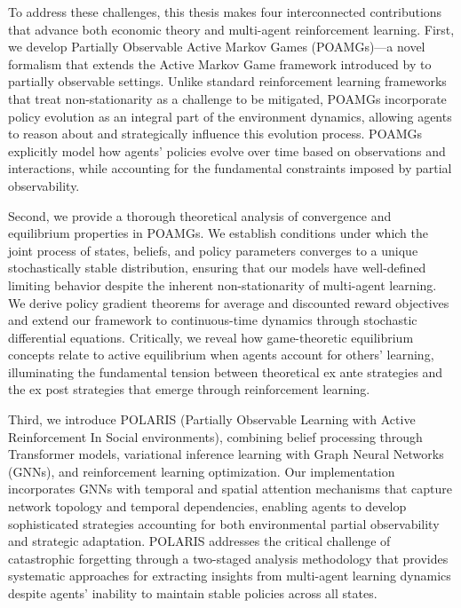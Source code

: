 To address these challenges, this thesis makes four interconnected contributions that advance both economic theory and multi-agent reinforcement learning. First, we develop Partially Observable Active Markov Games (POAMGs)—a novel formalism that extends the Active Markov Game framework introduced by \citet{kim2022influencing} to partially observable settings. Unlike standard reinforcement learning frameworks that treat non-stationarity as a challenge to be mitigated, POAMGs incorporate policy evolution as an integral part of the environment dynamics, allowing agents to reason about and strategically influence this evolution process. POAMGs explicitly model how agents' policies evolve over time based on observations and interactions, while accounting for the fundamental constraints imposed by partial observability.

Second, we provide a thorough theoretical analysis of convergence and equilibrium properties in POAMGs. We establish conditions under which the joint process of states, beliefs, and policy parameters converges to a unique stochastically stable distribution, ensuring that our models have well-defined limiting behavior despite the inherent non-stationarity of multi-agent learning. We derive policy gradient theorems for average and discounted reward objectives and extend our framework to continuous-time dynamics through stochastic differential equations. Critically, we reveal how game-theoretic equilibrium concepts relate to active equilibrium when agents account for others' learning, illuminating the fundamental tension between theoretical ex ante strategies and the ex post strategies that emerge through reinforcement learning.

Third, we introduce POLARIS (Partially Observable Learning with Active Reinforcement In Social environments), combining belief processing through Transformer models, variational inference learning with Graph Neural Networks (GNNs), and reinforcement learning optimization. Our implementation incorporates GNNs with temporal and spatial attention mechanisms that capture network topology and temporal dependencies, enabling agents to develop sophisticated strategies accounting for both environmental partial observability and strategic adaptation. POLARIS addresses the critical challenge of catastrophic forgetting through a two-staged analysis methodology that provides systematic approaches for extracting insights from multi-agent learning dynamics despite agents' inability to maintain stable policies across all states.

